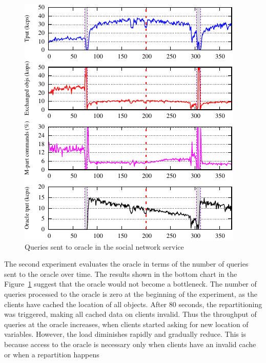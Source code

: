 \begin{figure}[ht!]
  \centering
    \includegraphics[width=0.8\columnwidth]{figures/experiments/dynastar/chirper-celeb-dynastar-oracle.pdf}
  \caption{Queries sent to oracle in the social network service}
  \label{fig:socialcelebrity-oracle}
\end{figure}


The second experiment evaluates the oracle in terms of the number of queries
sent to the oracle over time. The results shown in the bottom chart in the
Figure~\ref{fig:socialcelebrity-oracle} suggest that the oracle would not become a
bottleneck. The number of queries processed to the oracle is zero at the
beginning of the experiment, as the clients have cached the location of all
objects. After 80 seconds, the repartitioning was triggered, making all cached
data on clients invalid. Thus the throughput of queries at the oracle increases,
when clients started asking for new location of variables. However, the load
diminishes rapidly and gradually reduce. This is because access to the oracle is
necessary only when clients have an invalid cache or when a repartition happens

